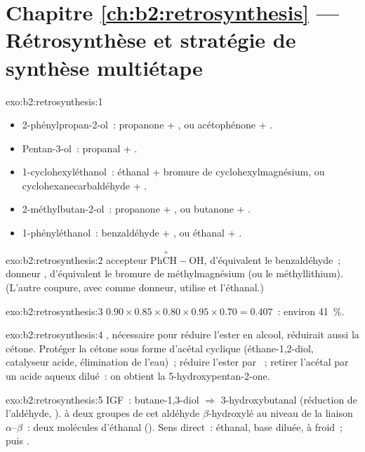 \section*{Chapitre \ref{ch:b2:retrosynthesis} --- Rétrosynthèse et stratégie de synthèse multiétape}

\begin{solution}{exo:b2:retrosynthesis:1}
\begin{itemize}
  \item 2-phénylpropan-2-ol~: propanone + , ou acétophénone + .
  \item Pentan-3-ol~: propanal + .
  \item 1-cyclohexyléthanol~: éthanal + bromure de cyclohexylmagnésium, ou cyclohexanecarbaldéhyde +
        .
  \item 2-méthylbutan-2-ol~: propanone + , ou butanone + .
  \item 1-phényléthanol~: benzaldéhyde + , ou éthanal + .
\end{itemize}
\end{solution}

\begin{solution}{exo:b2:retrosynthesis:2}
 accepteur $\mathrm{Ph\overset{+}{C}H{-}OH}$, d'équivalent le benzaldéhyde~;  donneur ,
d'équivalent le bromure de méthylmagnésium (ou le méthyllithium). (L'autre coupure, avec  comme
donneur, utilise  et l'éthanal.)
\end{solution}

\begin{solution}{exo:b2:retrosynthesis:3}
$0.90 \times 0.85 \times 0.80 \times 0.95 \times 0.70 = 0.407$~: environ 41~\%.
\end{solution}

\begin{solution}{exo:b2:retrosynthesis:4}
, nécessaire pour réduire l'ester en alcool, réduirait aussi la cétone. Protéger la cétone
sous forme d'acétal cyclique (éthane-1,2-diol, catalyseur acide, élimination de l'eau)~; réduire l'ester
par ~; retirer l'acétal par un acide aqueux dilué~: on obtient la 5-hydroxypentan-2-one.
\end{solution}

\begin{solution}{exo:b2:retrosynthesis:5}
IGF~: butane-1,3-diol $\Rightarrow$ 3-hydroxybutanal (réduction de l'aldéhyde, ). 
à deux groupes de cet aldéhyde $\beta$-hydroxylé au niveau de la liaison $\alpha$--$\beta$~: deux molécules
d'éthanal (). Sens direct~: éthanal, base diluée, à froid~; puis .
\end{solution}

